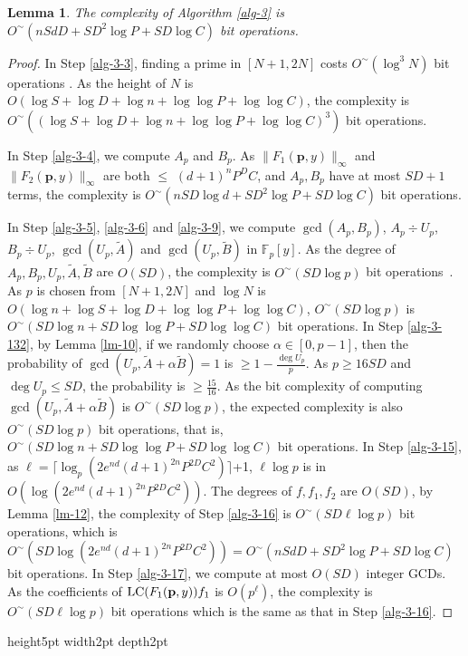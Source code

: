 \documentclass[final,20pt]{elsarticle}
\newtheorem{lemma}[theorem]{Lemma}
\def\F{{\mathbb{F}}}
\def\LC{\hbox{\rm{LC}}}
\def\qed{\hfil {\vrule height5pt width2pt depth2pt}}
\begin{document}
\begin{lemma}\label{lm-13}
 The complexity of Algorithm \ref{alg-3} is $O^\sim(nSdD+SD^2\log P+SD\log C)$ bit operations.
\end{lemma}
\begin{proof}
In Step \ref{alg-3-3}, finding  a prime in $[N+1,2N]$ costs $O^\sim(\log^3 N)$ bit operations \cite[The.18.8]{GaGer13}. As the height of $N$ is $O(\log S+\log D+\log n+\log \log P+\log \log C)$, the complexity is $O^\sim((\log S+\log D+\log n+\log \log P+\log \log C)^3)$ bit operations.

In Step \ref{alg-3-4}, we compute $A_p$ and $B_p$. As $\|F_1(\mathbf{p},y)\|_{\infty}$ and $\|F_2(\mathbf{p},y)\|_{\infty}$  are both $\le$ $(d+1)^nP^DC$, and $A_p,B_p$ have at most $SD+1$ terms, the complexity is $O^\sim(nSD\log d+SD^2\log P+SD\log C)$ bit operations.

In Step \ref{alg-3-5}, \ref{alg-3-6} and \ref{alg-3-9}, we compute $\gcd(A_p,B_p)$,  $A_p \div U_p$, $B_p \div U_p$, $\gcd(U_p,\widetilde{A})$ and $\gcd(U_p,\widetilde{B})$ in $\F_p[y]$. As the degree of $A_p,B_p,U_p,\widetilde{A},\widetilde{B}$ are $O(SD)$, the complexity is $O^\sim(SD\log p)$ bit operations~\cite[Cor.3.14]{P2010Algebraic}.
%
As $p$ is chosen from $[N+1,2N]$ and $\log N$ is $O(\log n+\log S+\log D+\log\log P+\log \log C)$, $O^\sim(SD\log p)$ is  $O^\sim(SD\log n+SD\log\log P+SD\log\log C)$ bit operations.
%
In Step \ref{alg-3-132}, by Lemma \ref{lm-10}, if we randomly choose $\alpha\in[0,p-1]$, then the probability of $\gcd(U_p,\widetilde{A}+\alpha \widetilde{B})=1$ is $\geq 1-\frac{\deg U_p}{p}$. As $p\geq 16SD$ and $\deg U_p\leq SD$, the probability is $\geq \frac{15}{16}$. As the bit complexity of computing $\gcd(U_p,\widetilde{A}+\alpha \widetilde{B})$ is $O^\sim(SD\log p)$, the expected complexity is also $O^\sim(SD\log p)$ bit operations, that is, $O^\sim(SD\log n+SD\log\log P+SD\log\log C)$ bit operations.
%
In Step \ref{alg-3-15}, as $\ell=\lceil\log_p (2e^{nd}(d+1)^{2n}P^{2D}C^2)\rceil$+1, $\ell \log p$ is in $O(\log (2e^{nd}(d+1)^{2n}P^{2D}C^2))$. The degrees of $f,f_1,f_2$ are $O(SD)$, by Lemma \ref{lm-12}, the complexity of Step \ref{alg-3-16} is $O^\sim(SD\ell \log p)$ bit operations, which is $O^\sim(SD\log (2e^{nd}(d+1)^{2n}P^{2D}C^2))=O^\sim(nSdD+SD^2\log P+SD\log C)$ bit operations.
%
In Step \ref{alg-3-17}, we compute at most $O(SD)$ integer GCDs. As the coefficients of $\LC(F_1(\mathbf{p},y))f_1$ is $O(p^{\ell})$, the complexity is $O^\sim(SD\ell \log p)$ bit operations which is the same as that in Step \ref{alg-3-16}.
\end{proof}\qed
\end{document}

